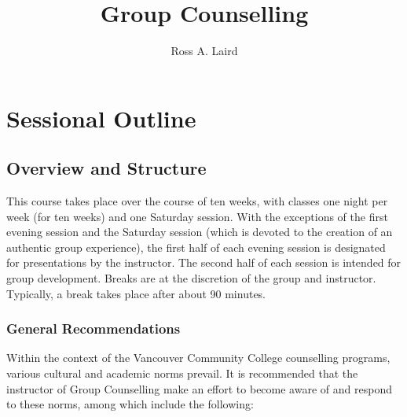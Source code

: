 \documentclass[12pt,DIV7,oneside,tocindent,headsepline]{scrbook}
\title{\fontfamily{pwt}\Huge{Group Counselling\\}}
\author{Ross A. Laird}
\begin{document}
\begin{titlingpage}
\begin{center}
\maketitle
\end{center}
\end{titlingpage}
\frontmatter
\begin{FlushLeft}
\tableofcontents  
\end{FlushLeft}
\clearpage
\mainmatter
\pagestyle{headings}
\chapter{Sessional Outline}
\section{Overview and Structure}  

This course takes place over the course of ten weeks, with classes one night per week (for ten weeks) and one Saturday session. With the exceptions of the first evening session and the Saturday session (which is devoted to the creation of an authentic group experience), the first half of each evening session is designated for presentations by the instructor. The second half of each session is intended for group development.  Breaks are at the discretion of the group and instructor. Typically, a break takes place after about 90 minutes.

\subsection{General Recommendations}
Within the context of the Vancouver Community College counselling programs, various cultural and academic norms prevail. It is recommended that the instructor of Group Counselling make an effort to become aware of and respond to these norms, among which include the following:
\end{document}
